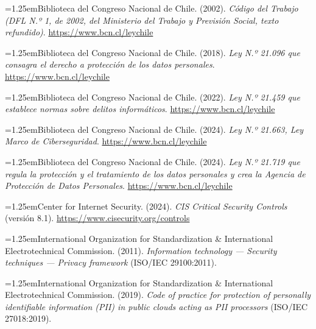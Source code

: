 \documentclass[11pt,a4paper]{article}
\newenvironment{hangparas}{\par\hangindent=1.25em\hangafter=1\noindent}{\par}
\begin{document}
\begin{hangparas}Biblioteca del Congreso Nacional de Chile. (2002). \textit{Código del Trabajo (DFL N.º 1, de 2002, del Ministerio del Trabajo y Previsión Social, texto refundido)}. \url{https://www.bcn.cl/leychile}\end{hangparas}

\begin{hangparas}Biblioteca del Congreso Nacional de Chile. (2018). \textit{Ley N.º 21.096 que consagra el derecho a protección de los datos personales}. \url{https://www.bcn.cl/leychile}\end{hangparas}

\begin{hangparas}Biblioteca del Congreso Nacional de Chile. (2022). \textit{Ley N.º 21.459 que establece normas sobre delitos informáticos}. \url{https://www.bcn.cl/leychile}\end{hangparas}

\begin{hangparas}Biblioteca del Congreso Nacional de Chile. (2024). \textit{Ley N.º 21.663, Ley Marco de Ciberseguridad}. \url{https://www.bcn.cl/leychile}\end{hangparas}

\begin{hangparas}Biblioteca del Congreso Nacional de Chile. (2024). \textit{Ley N.º 21.719 que regula la protección y el tratamiento de los datos personales y crea la Agencia de Protección de Datos Personales}. \url{https://www.bcn.cl/leychile}\end{hangparas}

\begin{hangparas}Center for Internet Security. (2024). \textit{CIS Critical Security Controls} (versión 8.1). \url{https://www.cisecurity.org/controls}\end{hangparas}

\begin{hangparas}International Organization for Standardization \& International Electrotechnical Commission. (2011). \textit{Information technology --- Security techniques --- Privacy framework} (ISO/IEC 29100:2011).\end{hangparas}

\begin{hangparas}International Organization for Standardization \& International Electrotechnical Commission. (2019). \textit{Code of practice for protection of personally identifiable information (PII) in public clouds acting as PII processors} (ISO/IEC 27018:2019).\end{hangparas}
\end{document}
